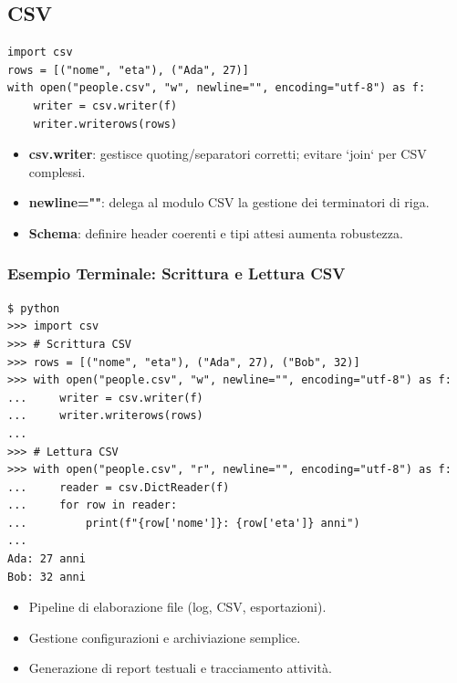 \subsection{CSV}
\begin{lstlisting}
import csv
rows = [("nome", "eta"), ("Ada", 27)]
with open("people.csv", "w", newline="", encoding="utf-8") as f:
    writer = csv.writer(f)
    writer.writerows(rows)
\end{lstlisting}
\begin{tcolorbox}[title=Spiegazione del codice]
\begin{itemize}
  \item \textbf{csv.writer}: gestisce quoting/separatori corretti; evitare `join` per CSV complessi.
  \item \textbf{newline=""}: delega al modulo CSV la gestione dei terminatori di riga.
  \item \textbf{Schema}: definire header coerenti e tipi attesi aumenta robustezza.
\end{itemize}
\end{tcolorbox}

\subsubsection{Esempio Terminale: Scrittura e Lettura CSV}
\begin{tcolorbox}[title={\faTerminal\ Output}, colback=black!5, colframe=black!70]
\begin{lstlisting}[style=python]
$ python
>>> import csv
>>> # Scrittura CSV
>>> rows = [("nome", "eta"), ("Ada", 27), ("Bob", 32)]
>>> with open("people.csv", "w", newline="", encoding="utf-8") as f:
...     writer = csv.writer(f)
...     writer.writerows(rows)
...
>>> # Lettura CSV
>>> with open("people.csv", "r", newline="", encoding="utf-8") as f:
...     reader = csv.DictReader(f)
...     for row in reader:
...         print(f"{row['nome']}: {row['eta']} anni")
...
Ada: 27 anni
Bob: 32 anni
\end{lstlisting}
\end{tcolorbox}

\begin{tcolorbox}[title=Casi d'uso]
\begin{itemize}
  \item Pipeline di elaborazione file (log, CSV, esportazioni).
  \item Gestione configurazioni e archiviazione semplice.
  \item Generazione di report testuali e tracciamento attività.
\end{itemize}
\end{tcolorbox}

